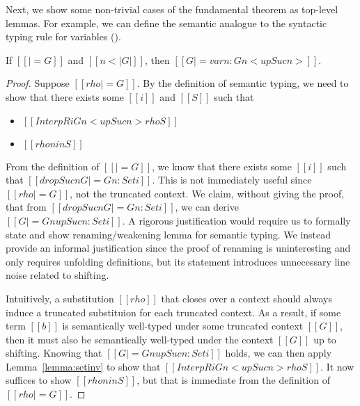 \documentclass[acmsmall,screen=true,
\ifpublic review=false\else,review=true\fi
  ,anonymous=\ifanonymous true\else false\fi]{acmart}
\begin{document}
Next, we show some non-trivial cases of the fundamental theorem as
top-level lemmas. For example, we can define the semantic analogue to the
syntactic typing rule for variables ().
\begin{lemma}[ST-Var]
  \label{lemma:stvar}
  If $[[|= G]]$ and $[[n < |G|]]$, then $[[G |= var n : G n < up Suc n  >]]$.
\end{lemma}
\begin{proof}
  Suppose $[[rho |= G]]$. By the definition of semantic typing, we
need to show that there exists some $[[i]]$ and $[[S]]$ such that
  \begin{itemize}
  \item $[[InterpR i G n < up Suc n > { rho } S]]$
  \item $[[rho n in S]]$
  \end{itemize}
  From the definition of $[[|= G]]$, we know that there exists some
  $[[i]]$ such that $[[drop Suc n G |= G n : Set i]]$. This is not
  immediately useful since $[[rho |= G]]$, not the truncated
  context. We claim, without giving the proof, that from $[[drop Suc n
  G |= G n  : Set i]]$, we can derive $[[G |= G n {up Suc n} : Set
  i]]$. A rigorous justification would require us to formally state
  and show renaming/weakening lemma for semantic typing. We instead
  provide an informal justification since the proof of renaming
  is uninteresting and only requires unfolding definitions, but its
  statement introduces unnecessary line noise related to shifting.

  Intuitively, a substitution $[[rho]]$
  that closes over a context should always induce a truncated
  substituion for each truncated context. As a result, if
  some term $[[b]]$ is semantically well-typed under some truncated
  context $[[G]]$, then it must also be semantically well-typed under
  the context $[[G]]$ up to shifting.
%
  Knowing that $[[G |= G n {up Suc n} : Set i]]$ holds, we can then
  apply Lemma~\ref{lemma:setinv} to show that
  $[[InterpR i G n < up Suc n > { rho } S]]$. It now
  suffices to show $[[rho n in S]]$, but that is immediate from the
  definition of $[[rho |= G]]$.
\end{proof}
\end{document}
